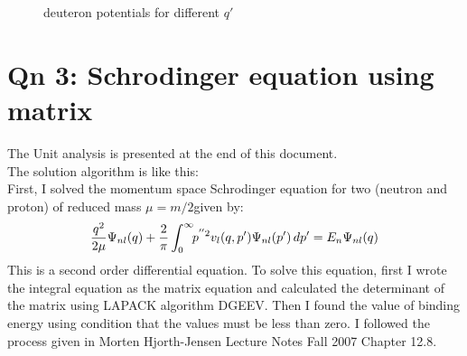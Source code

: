 \documentclass[11pt,a4paper,english]{article}
\begin{document}
\begin{figure}[!ht]
\hfill
{}
\hfill
{}
\hfill
\caption{deuteron potentials for different $q'$ }
\end{figure}
	
\section{Qn 3: Schrodinger equation using matrix }
    The Unit analysis is presented at the end of this document.\\
    The solution algorithm is like this:\\
    First, I solved the momentum space Schrodinger equation for two
    (neutron and proton) of reduced mass $\mu=m/2$given by:\\
	\begin{equation}
	      \frac{q^2}{2\mu} \Psi_{nl}(q) \\
	    + \frac{2}{\pi} \int_{0}^{\infty} \!\! p^{''2} v_l(q,p') \Psi_{nl}(p')\,dp' \\
	 = E_n\Psi_{nl}(q)
	\end{equation}
	This is a second order differential equation. To solve this equation, first I
	wrote the integral equation as the matrix equation and calculated the determinant
	of the matrix using LAPACK algorithm DGEEV. Then I found the value of binding energy
	using condition that the values must be less than zero.
	I followed the process given in Morten Hjorth-Jensen Lecture Notes Fall 2007 Chapter
	12.8.
	
\end{document}
